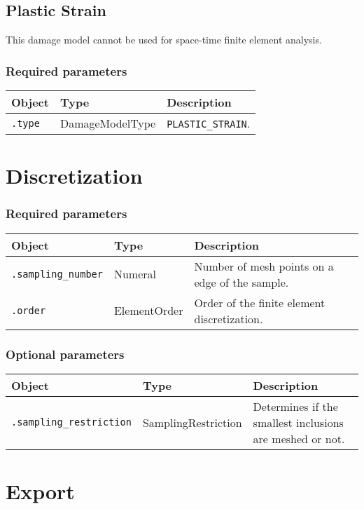 \documentclass[10pt]{article}
\begin{document}
\subsection{Plastic Strain}

This damage model cannot be used for space-time finite element analysis.

\subsubsection*{Required parameters}

\begin{tabularx}{\textwidth}{llX}
\hline 
Object & Type & Description \\ 
\hline 
\verb+.type+ & DamageModelType & \verb+PLASTIC_STRAIN+. \\ 
\hline 
\end{tabularx}

\section{Discretization}

\subsubsection*{Required parameters}

\begin{tabularx}{\textwidth}{llX}
\hline 
Object & Type & Description \\ 
\hline 
\verb+.sampling_number+ & Numeral & Number of mesh points on a edge of the sample. \\ 
\verb+.order+ & ElementOrder & Order of the finite element discretization.\\
\hline 
\end{tabularx}

\subsubsection*{Optional parameters}

\begin{tabularx}{\textwidth}{llX}
\hline 
Object & Type & Description \\ 
\hline 
\verb+.sampling_restriction+ & SamplingRestriction & Determines if the smallest inclusions are meshed or not. \\ 
\hline 
\end{tabularx} 

\section{Export}
\end{document}
